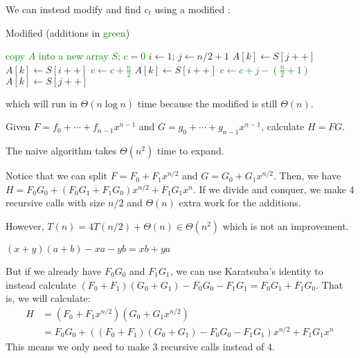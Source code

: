 We can instead modify  and find $c_t$ using a modified :
\begin{algorithm}[H]
  \caption{Modified  (additions in \textcolor{Green}{green})}
  \begin{algorithmic}[1]
    \State \textcolor{Green}{copy $A$ into a new array $S$; $c = 0$}
    \State $i \gets 1$; $j \gets n/2+1$
     $A[k] \gets S[j++]$
    \State $A[k] \gets S[i++]$
    \State \textcolor{Green}{$c \gets c + \frac{n}{2}$}
    \State $A[k] \gets S[i++]$
    \State \textcolor{Green}{$c \gets c + j - (\frac{n}{2}+1)$}
    \Else{} $A[k] \gets S[j++]$
    \EndIf
    \EndFor
  \end{algorithmic}
\end{algorithm}
which will run in $\Theta(n\log n)$ time because the modified  is still $\Theta(n)$.

\begin{problem}
Given $F = f_0 + \dotsb + f_{n-1}x^{n-1}$
and $G = g_0 + \dotsb + g_{n-1}x^{n-1}$,
calculate $H = FG$.
\end{problem}

The naive algorithm takes $\Theta(n^2)$ time to expand.

Notice that we can split $F = F_0 + F_1x^{n/2}$ and $G = G_0 + G_1x^{n/2}$.
Then, we have $H = F_0G_0 + (F_0G_1+F_1G_0)x^{n/2} + F_1G_1x^n$.
If we divide and conquer, we make 4 recursive calls with size $n/2$
and $\Theta(n)$ extra work for the additions.

However, $T(n) = 4T(n/2)+\Theta(n) \in \Theta(n^2)$ which is not an improvement.

\begin{lemma}
  $(x+y)(a+b) - xa - yb = xb + ya$
\end{lemma}

But if we already have $F_0G_0$ and $F_1G_1$,
we can use Karatsuba's identity to instead calculate
$(F_0 + F_1)(G_0 + G_1) - F_0G_0 - F_1G_1 = F_0G_1 + F_1G_0$.
That is, we will calculate:
\begin{align*}
  H & = (F_0 + F_1x^{n/2})(G_0 + G_1x^{n/2})                           \\
    & = F_0G_0 + ((F_0+F_1)(G_0+G_1)-F_0G_0-F_1G_1)x^{n/2} + F_1G_1x^n
\end{align*}
This means we only need to make 3 recursive calls instead of 4.

